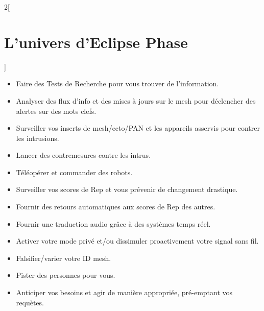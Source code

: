 \documentclass[a4paper,9pt]{article}
\begin{document}
\begin{multicols}{2}[\section{L'univers d'Eclipse Phase}]
\begin{itemize}
\item Faire des Tests de Recherche pour vous trouver de l'information.
\item Analyser des flux d'info et des mises à jours sur le mesh pour déclencher des alertes sur des mots clefs.
\item Surveiller vos inserts de mesh/ecto/PAN et les appareils asservis pour contrer les intrusions.
\item Lancer des contremesures contre les intrus.
\item Téléopérer et commander des robots.
\item Surveiller vos scores de Rep et vous prévenir de changement drastique.
\item Fournir des retours automatiques aux scores de Rep des autres.
\item Fournir une traduction audio grâce à des systèmes temps réel.
\item Activer votre mode privé et/ou dissimuler proactivement votre signal sans fil.
\item Falsifier/varier votre ID mesh.
\item Pister des personnes pour vous.
\item Anticiper vos besoins et agir de manière appropriée, pré-emptant vos requètes.
\end{itemize} 


\end{multicols}
\end{document}
